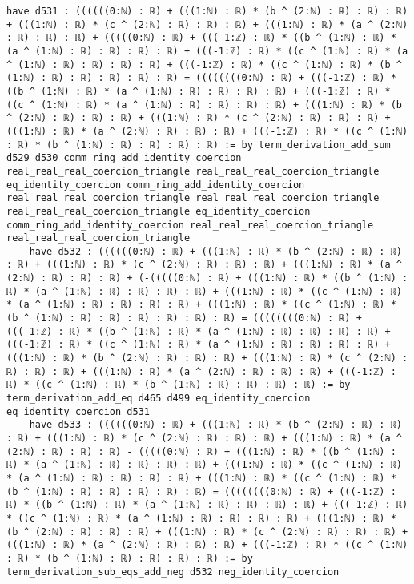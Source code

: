 \documentclass{article}
\begin{document}
\begin{tcolorbox}[colback=white!10, width=\linewidth]
\begin{lstlisting}[language=Lean4]
    have d531 : ((((((0:ℕ) : ℝ) + (((1:ℕ) : ℝ) * (b ^ (2:ℕ) : ℝ) : ℝ) : ℝ) + (((1:ℕ) : ℝ) * (c ^ (2:ℕ) : ℝ) : ℝ) : ℝ) + (((1:ℕ) : ℝ) * (a ^ (2:ℕ) : ℝ) : ℝ) : ℝ) + (((((0:ℕ) : ℝ) + (((-1:ℤ) : ℝ) * ((b ^ (1:ℕ) : ℝ) * (a ^ (1:ℕ) : ℝ) : ℝ) : ℝ) : ℝ) + (((-1:ℤ) : ℝ) * ((c ^ (1:ℕ) : ℝ) * (a ^ (1:ℕ) : ℝ) : ℝ) : ℝ) : ℝ) + (((-1:ℤ) : ℝ) * ((c ^ (1:ℕ) : ℝ) * (b ^ (1:ℕ) : ℝ) : ℝ) : ℝ) : ℝ) : ℝ) = ((((((((0:ℕ) : ℝ) + (((-1:ℤ) : ℝ) * ((b ^ (1:ℕ) : ℝ) * (a ^ (1:ℕ) : ℝ) : ℝ) : ℝ) : ℝ) + (((-1:ℤ) : ℝ) * ((c ^ (1:ℕ) : ℝ) * (a ^ (1:ℕ) : ℝ) : ℝ) : ℝ) : ℝ) + (((1:ℕ) : ℝ) * (b ^ (2:ℕ) : ℝ) : ℝ) : ℝ) + (((1:ℕ) : ℝ) * (c ^ (2:ℕ) : ℝ) : ℝ) : ℝ) + (((1:ℕ) : ℝ) * (a ^ (2:ℕ) : ℝ) : ℝ) : ℝ) + (((-1:ℤ) : ℝ) * ((c ^ (1:ℕ) : ℝ) * (b ^ (1:ℕ) : ℝ) : ℝ) : ℝ) : ℝ) := by term_derivation_add_sum d529 d530 comm_ring_add_identity_coercion real_real_real_coercion_triangle real_real_real_coercion_triangle eq_identity_coercion comm_ring_add_identity_coercion real_real_real_coercion_triangle real_real_real_coercion_triangle real_real_real_coercion_triangle eq_identity_coercion comm_ring_add_identity_coercion real_real_real_coercion_triangle real_real_real_coercion_triangle
    have d532 : ((((((0:ℕ) : ℝ) + (((1:ℕ) : ℝ) * (b ^ (2:ℕ) : ℝ) : ℝ) : ℝ) + (((1:ℕ) : ℝ) * (c ^ (2:ℕ) : ℝ) : ℝ) : ℝ) + (((1:ℕ) : ℝ) * (a ^ (2:ℕ) : ℝ) : ℝ) : ℝ) + (-(((((0:ℕ) : ℝ) + (((1:ℕ) : ℝ) * ((b ^ (1:ℕ) : ℝ) * (a ^ (1:ℕ) : ℝ) : ℝ) : ℝ) : ℝ) + (((1:ℕ) : ℝ) * ((c ^ (1:ℕ) : ℝ) * (a ^ (1:ℕ) : ℝ) : ℝ) : ℝ) : ℝ) + (((1:ℕ) : ℝ) * ((c ^ (1:ℕ) : ℝ) * (b ^ (1:ℕ) : ℝ) : ℝ) : ℝ) : ℝ) : ℝ) : ℝ) = ((((((((0:ℕ) : ℝ) + (((-1:ℤ) : ℝ) * ((b ^ (1:ℕ) : ℝ) * (a ^ (1:ℕ) : ℝ) : ℝ) : ℝ) : ℝ) + (((-1:ℤ) : ℝ) * ((c ^ (1:ℕ) : ℝ) * (a ^ (1:ℕ) : ℝ) : ℝ) : ℝ) : ℝ) + (((1:ℕ) : ℝ) * (b ^ (2:ℕ) : ℝ) : ℝ) : ℝ) + (((1:ℕ) : ℝ) * (c ^ (2:ℕ) : ℝ) : ℝ) : ℝ) + (((1:ℕ) : ℝ) * (a ^ (2:ℕ) : ℝ) : ℝ) : ℝ) + (((-1:ℤ) : ℝ) * ((c ^ (1:ℕ) : ℝ) * (b ^ (1:ℕ) : ℝ) : ℝ) : ℝ) : ℝ) := by term_derivation_add_eq d465 d499 eq_identity_coercion eq_identity_coercion d531
    have d533 : ((((((0:ℕ) : ℝ) + (((1:ℕ) : ℝ) * (b ^ (2:ℕ) : ℝ) : ℝ) : ℝ) + (((1:ℕ) : ℝ) * (c ^ (2:ℕ) : ℝ) : ℝ) : ℝ) + (((1:ℕ) : ℝ) * (a ^ (2:ℕ) : ℝ) : ℝ) : ℝ) - (((((0:ℕ) : ℝ) + (((1:ℕ) : ℝ) * ((b ^ (1:ℕ) : ℝ) * (a ^ (1:ℕ) : ℝ) : ℝ) : ℝ) : ℝ) + (((1:ℕ) : ℝ) * ((c ^ (1:ℕ) : ℝ) * (a ^ (1:ℕ) : ℝ) : ℝ) : ℝ) : ℝ) + (((1:ℕ) : ℝ) * ((c ^ (1:ℕ) : ℝ) * (b ^ (1:ℕ) : ℝ) : ℝ) : ℝ) : ℝ) : ℝ) = ((((((((0:ℕ) : ℝ) + (((-1:ℤ) : ℝ) * ((b ^ (1:ℕ) : ℝ) * (a ^ (1:ℕ) : ℝ) : ℝ) : ℝ) : ℝ) + (((-1:ℤ) : ℝ) * ((c ^ (1:ℕ) : ℝ) * (a ^ (1:ℕ) : ℝ) : ℝ) : ℝ) : ℝ) + (((1:ℕ) : ℝ) * (b ^ (2:ℕ) : ℝ) : ℝ) : ℝ) + (((1:ℕ) : ℝ) * (c ^ (2:ℕ) : ℝ) : ℝ) : ℝ) + (((1:ℕ) : ℝ) * (a ^ (2:ℕ) : ℝ) : ℝ) : ℝ) + (((-1:ℤ) : ℝ) * ((c ^ (1:ℕ) : ℝ) * (b ^ (1:ℕ) : ℝ) : ℝ) : ℝ) : ℝ) := by term_derivation_sub_eqs_add_neg d532 neg_identity_coercion

\end{lstlisting}
\end{tcolorbox}
\end{document}
